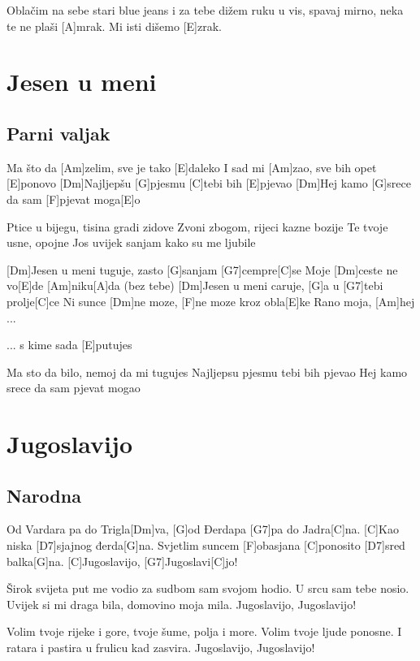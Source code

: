 \documentclass[a4paper,12pt]{article}
\begin{document}
\begin{multicols}{2}
\begin{guitar}
[E]Oblačim na sebe stari blue jeans
i za tebe dižem ruku u vis,
spavaj mirno, neka te ne plaši [A]mrak.
Mi isti dišemo [E]zrak.


\end{guitar}
\section{Jesen u meni}
\subsection*{Parni valjak}
\begin{guitar}
Ma što da [Am]zelim, sve je tako [E]daleko
I sad mi [Am]zao, sve bih opet [E]ponovo
[Dm]Najljepšu [G]pjesmu [C]tebi bih [E]pjevao
[Dm]Hej kamo [G]srece da sam [F]pjevat moga[E]o


Ptice u bijegu, tisina gradi zidove
Zvoni zbogom, rijeci kazne bozije
Te tvoje usne, opojne
Jos uvijek sanjam kako su me ljubile 


[Dm]Jesen u meni tuguje, zasto [G]sanjam [G7]cempre[C]se
Moje [Dm]ceste ne vo[E]de [Am]niku[A]da (bez tebe)
[Dm]Jesen u meni caruje, [G]a u [G7]tebi prolje[C]ce
Ni sunce [Dm]ne moze, [F]ne moze kroz obla[E]ke
Rano moja, [Am]hej ...


... s kime sada [E]putujes

Ma sto da bilo, nemoj da mi tugujes
Najljepsu pjesmu tebi bih pjevao
Hej kamo srece da sam pjevat mogao

\end{guitar}
\section{Jugoslavijo}
\subsection*{Narodna}
\begin{guitar}
[C]Od Vardara pa do Trigla[Dm]va,
[G]od Đerdapa [G7]pa do Jadra[C]na.
[C]Kao niska [D7]sjajnog đerda[G]na.
Svjetlim suncem [F]obasjana
[C]ponosito [D7]sred balka[G]na.
[C]Jugoslavijo, [G7]Jugoslavi[C]jo!



Širok svijeta put me vodio
za sudbom sam svojom hodio.
U srcu sam tebe nosio.
Uvijek si mi draga bila,
domovino moja mila.
Jugoslavijo, Jugoslavijo!



Volim tvoje rijeke i gore,
tvoje šume, polja i more.
Volim tvoje ljude ponosne.
I ratara i pastira
u frulicu kad zasvira.
Jugoslavijo, Jugoslavijo!




\end{guitar}
\end{multicols}
\end{document}
